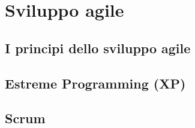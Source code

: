
\section{Sviluppo agile}

\subsection{I principi dello sviluppo agile}

\subsection{Estreme Programming (XP)}

\subsection{Scrum}